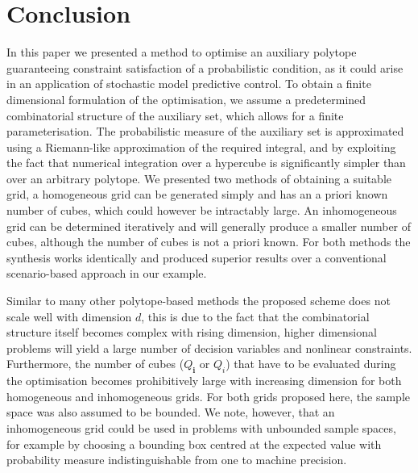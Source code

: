 \documentclass[letterpaper, 10pt, conference]{ieeeconf} %
\providecommand{\bfa}[1]{\mathbf{#1}}
\begin{document}
\section{Conclusion}\label{sec:conclusion}
%
%
%
%
%
\noindent In this paper we presented a method to optimise an auxiliary polytope guaranteeing constraint satisfaction of a probabilistic condition, as it could arise in an application of stochastic model predictive control.
%
To obtain a finite dimensional formulation of the optimisation, we assume a predetermined combinatorial structure of the auxiliary set, which allows for a finite parameterisation. 
%
The probabilistic measure of the auxiliary set is approximated using a Riemann-like approximation of the required integral, and by exploiting the fact that numerical integration over a hypercube is significantly simpler than over an arbitrary polytope.
%
We presented two methods of obtaining a suitable grid, a homogeneous grid can be generated simply and has an a priori known number of cubes, which could however be intractably large.
%
An inhomogeneous grid can be determined iteratively and will generally produce a smaller number of cubes, although the number of cubes is not a priori known.
%
For both methods the synthesis works identically and produced superior results over a conventional scenario-based approach in our example.
%


%
Similar to many other polytope-based methods the proposed scheme does not scale well with dimension $d$, this is due to the fact that the combinatorial structure itself becomes complex with rising dimension, higher dimensional problems will yield a large number of decision variables and nonlinear constraints.
%
Furthermore, the number of cubes ($Q_\bfa{i}$ or $Q_i$) that have to be evaluated during the optimisation becomes prohibitively large with increasing dimension for both homogeneous and inhomogeneous grids.
%
For both grids proposed here, the sample space was also assumed to be bounded. We note, however, that an inhomogeneous grid could be used in problems with unbounded sample spaces, for example by choosing a bounding box centred at the expected value with probability measure indistinguishable from one to machine precision.

\printbibliography
\end{document}
